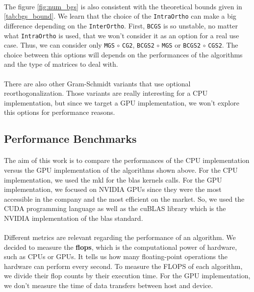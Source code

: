\paragraph*{}
The figure \ref{fig:num_bgs} is also consistent with the theoretical bounds given in \ref{tab:bgs_bound}. We learn that the choice of the \texttt{IntraOrtho} can make a big difference depending on the \texttt{InterOrtho}. First, \texttt{BCGS} is so unstable, no matter what \texttt{IntraOrtho} is used, that we won't consider it as an option for a real use case. Thus, we can consider only \texttt{MGS} $\circ$ \texttt{CG2}, \texttt{BCGS2} $\circ$ \texttt{MGS} or \texttt{BCGS2} $\circ$ \texttt{CGS2}. The choice between this options will depends on the performances of the algorithms and the type of matrices to deal with.

\paragraph*{}
There are also other Gram-Schmidt variants that use optional reorthogonalization. Those variants are really interesting for a CPU implementation, but since we target a GPU implementation, we won't explore this options for performance reasons.

\newpage
\subsection{Performance Benchmarks}
\paragraph*{}
The aim of this work is to compare the performances of the CPU implementation versus the GPU implementation of the algorithms shown above. For the CPU implementation, we used the \acrfull{mkl} \cite{intelMKL} for the \acrshort{blas} kernels calls. For the GPU implementation, we focused on NVIDIA GPUs since they were the most accessible in the company and the most efficient on the market. So, we used the CUDA programming language as well as the cuBLAS library \cite{cuBLAS} which is the NVIDIA implementation of the \acrshort{blas} standard.

\paragraph*{}
Different metrics are relevant regarding the performance of an algorithm. We decided to measure the \textbf{\acrfull{flops}}, which is the computational power of hardware, such as CPUs or GPUs. It tells us how many floating-point operations the hardware can perform every second. To measure the FLOPS of each algorithm, we divide their flop counts by their execution time. For the GPU implementation, we don't measure the time of data transfers between host and device.

